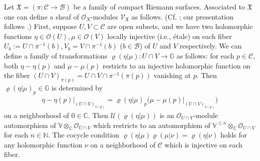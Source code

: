 \documentclass[12pt,a4paper,notitlepage]{article}
\theoremstyle{definition}
\theoremstyle{plain}
\newcommand{\fk}{\mathfrak}
\newcommand{\mc}{\mathcal}
\newcommand{\scr}{\mathscr}
\newcommand{\Vbb}{\mathbb V}
\newcommand{\Gbb}{\mathbb G}
\newcommand{\Cbb}{\mathbb C}
\newcommand{\Nbb}{\mathbb N}
\numberwithin{equation}{section}
\begin{document}
Let $\fk X=(\pi:\mc C\rightarrow\mc B)$ be a family of compact Riemann surfaces. Associated to $\fk X$ one can define a sheaf of $\scr O_X$-modules $\scr V_{\fk X}$ as follows. (Cf. \cite[Chapter 6, 17]{FB04}; our presentation follows \cite[Sec. 5]{Gui20}.) First, suppose $U,V\subset\mc C$ are open subsets, and we have two holomorphic functions $\eta\in\scr O(U),\mu\in\scr O(V)$ locally injective (i.e., \'etale) on  each fiber $U_b:=U\cap\pi^{-1}(b),V_b=V\cap\pi^{-1}(b)$ ($b\in\mc B$) of $U$ and $V$ respectively. We can define a family of transformations $\varrho(\eta|\mu):U\cap V\rightarrow\Gbb$  as follows: for each $p\in\mc C$, both $\eta-\eta(p)$ and $\mu-\mu(p)$ restricts to an injective holomorphic function on the fiber $(U\cap V)_{\pi(p)}=U\cap V\cap\pi^{-1}(\pi(p))$ vanishing at $p$. Then $\varrho(\eta|\mu)_p\in\Gbb$ is determined by 
\begin{align}
\boxed{~\eta-\eta(p)\big|_{(U\cap V)_{\pi(p)}}	=\varrho(\eta|\mu)_p\big(\mu-\mu(p)\big|_{(U\cap V)_{\pi(p)}}\big)~}\label{eq10}
\end{align}
on a neighborhood of $0\in\Cbb$. Then $\mc U(\varrho(\eta|\mu))$ is an $\scr O_{U\cap V}$-module automorphism of $\Vbb\otimes_\Cbb\scr O_{U\cap V}$ which restricts to an automorphism of $\Vbb^{\leq n}\otimes_\Cbb\scr O_{U\cap V}$ for each $n\in\Nbb$. The cocycle condition $\varrho(\eta|\mu)\varrho(\mu|\nu)=\varrho(\eta|\nu)$ holds for any holomorphic function $\nu$ on a neighborhood of $\mc C$ which is injective on each fiber. 
\end{document}
